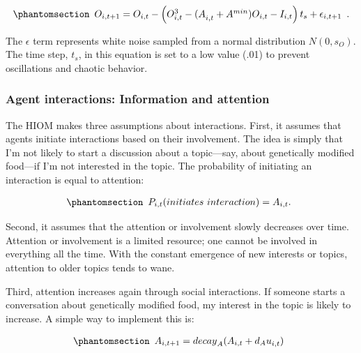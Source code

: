 \documentclass[
  a4paper,
  DIV=11,
  numbers=noendperiod,
  oneside]{scrreprt}
\begin{document}
\begin{equation}\phantomsection\label{eq-ch7-3-old-52}{\begin{array}{r}
O_{i,t+1}=O_{i,t}-\left(O_{i,t}^3-{(A}_{i,t}+A^{min})O_{i,t}-I_{i,t}\right)t_s+\epsilon_{i,t+1}
\end{array}.}\end{equation}

The \(\epsilon\) term represents white noise sampled from a normal
distribution \(N(0, s_{O})\). The time step, \(t_{s}\), in this equation
is set to a low value (.01) to prevent oscillations and chaotic
behavior.

\subsubsection{Agent interactions: Information and
attention}\label{sec-Agent-interactions-information-and-attention}

The HIOM makes three assumptions about interactions. First, it assumes
that agents initiate interactions based on their involvement. The idea
is simply that I'm not likely to start a discussion about a topic---say,
about genetically modified food---if I'm not interested in the topic.
The probability of initiating an interaction is equal to attention:

\begin{equation}\phantomsection\label{eq-ch7-4-old-53}{\begin{array}{r}
P_{i,t}(initiates\ interaction) = A_{i,t}.
\end{array}}\end{equation}

Second, it assumes that the attention or involvement slowly decreases
over time. Attention or involvement is a limited resource; one cannot be
involved in everything all the time. With the constant emergence of new
interests or topics, attention to older topics tends to wane.

Third, attention increases again through social interactions. If someone
starts a conversation about genetically modified food, my interest in
the topic is likely to increase. A simple way to implement this is:

\begin{equation}\phantomsection\label{eq-ch7-5-old-54}{\begin{array}{r}
A_{i,t+1}={decay}_A(A_{i,t}+{d_Au}_{i,t})
\end{array}}\end{equation}
\end{document}
